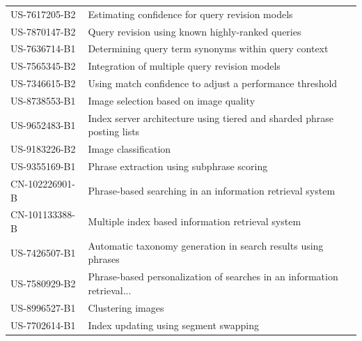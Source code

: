 \begin{table}[]
\begin{tabular}{ll}
US-7617205-B2    & Estimating confidence for query revision models                                                                 \\
US-7870147-B2    & Query revision using known highly-ranked queries                                                                \\
US-7636714-B1    & Determining query term synonyms within query context                                                            \\
US-7565345-B2    & Integration of multiple query revision models                                                                   \\
US-7346615-B2    & Using match confidence to adjust a performance threshold                                                        \\
US-8738553-B1    & Image selection based on image quality                                                                          \\
US-9652483-B1    & Index server architecture using tiered and sharded phrase posting lists                                         \\
US-9183226-B2    & Image classification                                                                                            \\
US-9355169-B1    & Phrase extraction using subphrase scoring                                                                       \\
CN-102226901-B   & Phrase-based searching in an information retrieval system                                                       \\
CN-101133388-B   & Multiple index based information retrieval system                                                               \\
US-7426507-B1    & Automatic taxonomy generation in search results using phrases                                                   \\
US-7580929-B2    & Phrase-based personalization of searches in an information retrieval...                                     \\
US-8996527-B1    & Clustering images                                                                                               \\
US-7702614-B1    & Index updating using segment swapping                                                                           \\

\end{tabular}
\end{table}
